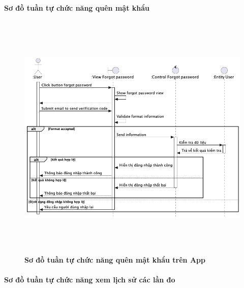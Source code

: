 \documentclass{article}%
\begin{document}
\paragraph{Sơ đồ tuần tự chức năng quên mật khẩu}
\mbox{}

    \begin{figure}[H]
         \centering
         \includegraphics[width=16cm,height=12cm]{Images/mobile_app/forgot_password.png}
         \caption[Sơ đồ tuần tự chức năng quên mật khẩu trên App]{\bfseries \fontsize{12pt}{0pt}
         \selectfont Sơ đồ tuần tự chức năng quên mật khẩu trên App}
         \label{hinh21} %
    \end{figure}

\paragraph{Sơ đồ tuần tự chức năng xem lịch sử các lần đo}
\mbox{}
\end{document}
